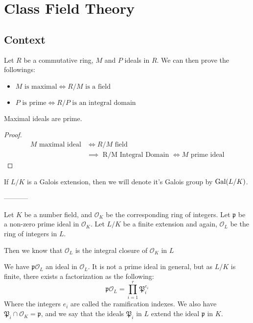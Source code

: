 \section{Class Field Theory}
\subsection{Context}
Let $R$ be a commutative ring, $M$ and $P$ ideals in $R$. We can then prove the followings:
\begin{theorem}
    \begin{itemize}
        \item $M \text{ is maximal} \iff R/M \text{ is a field}$
        \item $P \text{ is prime} \iff R/P \text{ is an integral domain}$
    \end{itemize}
\end{theorem}
\begin{property}
    Maximal ideals are prime. 
\end{property}
\begin{proof}
    \begin{align*}
        M \text{ maximal ideal} &\iff R/M \text{ field}\\
                                &\implies \text{ R/M Integral Domain } \iff M \text{ prime ideal}
    \end{align*}
\end{proof}

If $L/K$ is a Galois extension, then we will denote it's Galois group by $\text{Gal}(L/K)$.



-----------



Let $K$ be a number field, and $\mathcal{O}_K$ be the corresponding ring of integers.
Let $\mathfrak{p}$ be a non-zero prime ideal in $\mathcal{O}_K$.
Let $L/K$ be a finite extension and again, $\mathcal{O}_L$ be the ring of integers in $L$.

Then we know that $\mathcal{O}_L$ is the integral closure of $\mathcal{O}_K$ in $L$

We have $\mathfrak{p}\mathcal{O}_L$ an ideal in $\mathcal{O}_L$.
It is not a prime ideal in general, but as $L/K$ is finite, there exists a factorization as the following:
$$
\mathfrak{p}\mathcal{O}_L = \prod_{i=1}^r \mathfrak{P}_i^{e_i}
$$
Where the integers $e_i$ are called the ramification indexes.
We also have $\mathfrak{P}_i \cap \mathcal{O}_K = \mathfrak{p}$, and we say that the ideals $\mathfrak{P}_i$ in $L$ extend the ideal $\mathfrak{p}$ in $K$.

